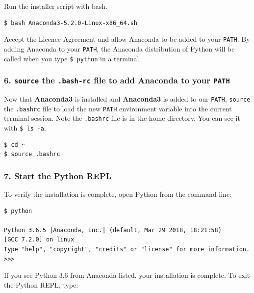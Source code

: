 \documentclass{book}
\begin{document}
Run the installer script with bash.

\begin{lstlisting}
$ bash Anaconda3-5.2.0-Linux-x86_64.sh
\end{lstlisting}

Accept the Licence Agreement and allow Anaconda to be added to your
\lstinline!PATH!. By adding Anaconda to your \lstinline!PATH!, the
Anaconda distribution of Python will be called when you type
\lstinline!$ python! in a terminal.
    




    
        \subsubsection{\texorpdfstring{6. \texttt{source} the \texttt{.bash-rc}
file to add Anaconda to your
\texttt{PATH}}{6. source the .bash-rc file to add Anaconda to your PATH}}\label{source-the-.bash-rc-file-to-add-anaconda-to-your-path}

Now that \textbf{Anaconda3} is installed and \textbf{Anaconda3} is added
to our \lstinline!PATH!, \lstinline!source! the \lstinline!.bashrc! file
to load the new \lstinline!PATH! environment variable into the current
terminal session. Note the \lstinline!.bashrc! file is in the home
directory. You can see it with \lstinline!$ ls -a!.

\begin{lstlisting}
$ cd ~
$ source .bashrc
\end{lstlisting}
    




    
        \subsubsection{7. Start the Python REPL}\label{start-the-python-repl}

To verify the installation is complete, open Python from the command
line:

\begin{lstlisting}
$ python

Python 3.6.5 |Anaconda, Inc.| (default, Mar 29 2018, 18:21:58)
[GCC 7.2.0] on linux
Type "help", "copyright", "credits" or "license" for more information.
>>>
\end{lstlisting}

If you see Python 3.6 from Anaconda listed, your installation is
complete. To exit the Python REPL, type:
\end{document}
